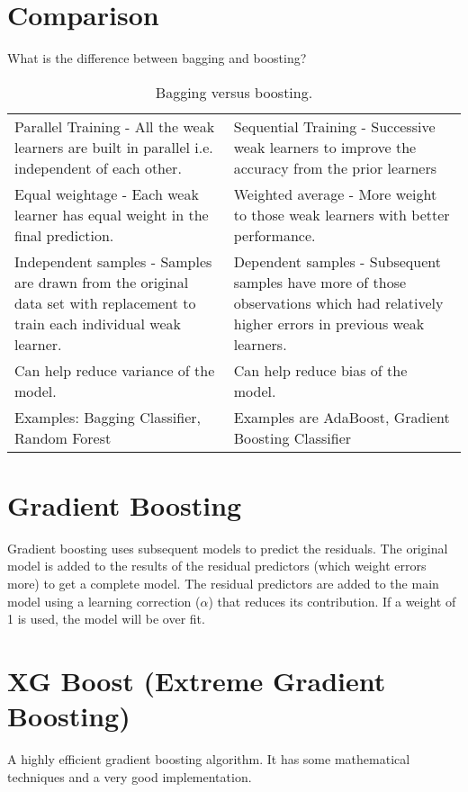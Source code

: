 	\section{Comparison}
What is the difference between bagging and boosting?

	\begin{table}
        \centering
        \caption[Bagging versus boosting]{Bagging versus boosting.}
        \label{tab:}
		\begin{tabular}{|p{}|p{}|} \hline
			\tablecolumnheadervlinesone{Bagging} & \tablecolumnheadervlinestwo{Boosting} \\ \hline
			Parallel Training - All the weak learners are built in parallel i.e. independent of each other. &
			Sequential Training - Successive weak learners to improve the accuracy from the prior learners \\ \hline
			Equal weightage - Each weak learner has equal weight in the final prediction. &
			Weighted average - More weight to those weak learners with better performance. \\ \hline
			Independent samples - Samples are drawn from the original data set with replacement to train each individual weak learner. &
			Dependent samples - Subsequent samples have more of those observations which had relatively higher errors in previous weak learners. \\ \hline
			Can help reduce variance of the model. &
			Can help reduce bias of the model. \\ \hline
			Examples: Bagging Classifier, Random Forest &
			Examples are AdaBoost, Gradient Boosting Classifier \\ \hline
		\end{tabular}
	\end{table}

	\section{Gradient Boosting}
Gradient boosting uses subsequent models to predict the residuals.  The original model is added to the results of the residual predictors (which weight errors more) to get a complete model.  The residual predictors are added to the main model using a learning correction ($\alpha$) that reduces its contribution.  If a weight of 1 is used, the model will be over fit.

	\section{XG Boost (Extreme Gradient Boosting)}
A highly efficient gradient boosting algorithm.  It has some mathematical techniques and a very good implementation.

